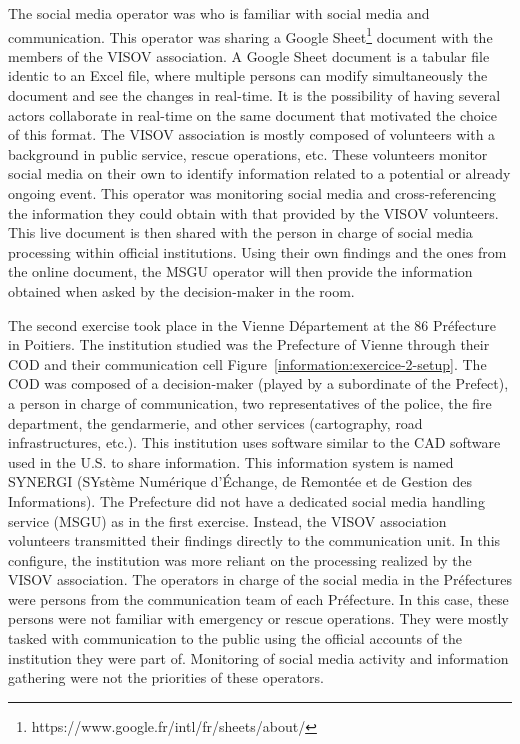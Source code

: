 The social media operator was who is familiar with social media and communication.
This operator was sharing a Google Sheet\footnote{https://www.google.fr/intl/fr/sheets/about/} document with the members of the VISOV association.
A Google Sheet document is a tabular file identic to an Excel file, where multiple persons can modify simultaneously the document and see the changes in real-time.
It is the possibility of having several actors collaborate in real-time on the same document that motivated the choice of this format.
The VISOV association is mostly composed of volunteers with a background in public service, rescue operations, etc.
These volunteers monitor social media on their own to identify information related to a potential or already ongoing event.
This operator was monitoring social media and cross-referencing the information they could obtain with that provided by the VISOV volunteers.
This live document is then shared with the person in charge of social media processing within official institutions.
Using their own findings and the ones from the online document, the MSGU operator will then provide the information obtained when asked by the decision-maker in the room.

The second exercise took place in the Vienne Département at the 86 Préfecture in Poitiers.
The institution studied was the Prefecture of Vienne through their COD and their communication cell Figure~\ref{information:exercice-2-setup}.
The COD was composed of a decision-maker (played by a subordinate of the Prefect), a person in charge of communication, two representatives of the police, the fire department, the gendarmerie, and other services (cartography, road infrastructures, etc.).
This institution uses software similar to the CAD software used in the U.S. to share information.
This information system is named SYNERGI (SYstème Numérique d’Échange, de Remontée et de Gestion des Informations).
The Prefecture did not have a dedicated social media handling service (MSGU) as in the first exercise.
Instead, the VISOV association volunteers transmitted their findings directly to the communication unit.
In this configure, the institution was more reliant on the processing realized by the VISOV association.
The operators in charge of the social media in the Préfectures were persons from the communication team of each Préfecture.
In this case, these persons were not familiar with emergency or rescue operations.
They were mostly tasked with communication to the public using the official accounts of the institution they were part of.
Monitoring of social media activity and information gathering were not the priorities of these operators.

